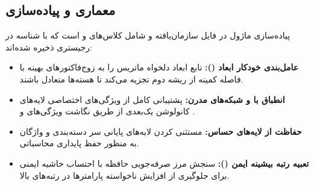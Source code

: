 \subsection{معماری و پیاده‌سازی}
پیاده‌سازی ماژول در فایل  سازمان‌یافته و شامل کلاس‌های  و  است که با شناسه  در رجیستری ذخیره شده‌اند:
\begin{itemize}
    \item \textbf{عامل‌بندی خودکار ابعاد ():} تابع  ابعاد دلخواه ماتریس را به زوج‌فاکتورهای بهینه با فاصله کمینه از ریشه دوم تجزیه می‌کند تا هسته‌ها متعادل باشند.
    \item \textbf{انطباق با  و شبکه‌های مدرن:} پشتیبانی کامل از ویژگی‌های اختصاصی لایه‌های کانولوشن یک‌بعدی  از طریق نگاشت ویژگی‌های  و .
    \item \textbf{حفاظت از لایه‌های حساس:} مستثنی کردن لایه‌های پایانی سر دسته‌بندی و واژگان به منظور حفظ پایداری محاسباتی.
    \item \textbf{تعبیه رتبه بیشینه ایمن ():} سنجش مرز صرفه‌جویی حافظه با احتساب حاشیه ایمنی  برای جلوگیری از افزایش ناخواسته پارامترها در رتبه‌های بالا.
\end{itemize}
